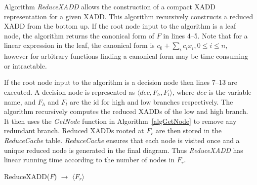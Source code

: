 \documentclass[twoside,11pt]{article}
\begin{document}
Algorithm \emph{ReduceXADD} allows the construction of a compact XADD representation for a given XADD. This algorithm recursively constructs a reduced XADD from the bottom up. 
If the root node input to the algorithm is a leaf node, the algorithm returns the canonical form of $F$ in lines 4--5. Note that for a linear expression in the leaf, the canonical form is $c_0+\sum_{i} c_i x_i , 0 \leq i \leq n$, however for arbitrary functions finding a canonical form may be time consuming or intractable. 

If the root node input to the algorithm is a decision node then lines 7--13 are executed. A decision node is represented as $\langle \mathit{dec}, F_h, F_l \rangle$, where $\mathit{dec}$ is the variable name, and $F_h$ and $F_l$ are the id for high and low branches respectively. The algorithm recursively computes the reduced XADDs of the low and high branch. It then uses the \emph{GetNode} function in Algorithm~\ref{algGetNode} to remove any redundant branch. 
Reduced XADDs rooted at $F_r$ are then stored in the \emph{ReduceCache} table. \emph{ReduceCache} ensures that each node is visited once and a unique reduced node is generated in the final diagram. Thus \emph{ReduceXADD} has linear running time according to the number of nodes in $F_r$.
\incmargin{.5em}
\linesnumbered
\begin{algorithm}[t!]
\dontprintsemicolon
{}
\caption{{\sc ReduceXADD}($F$) $\longrightarrow$ $\langle F_r \rangle$ \label{algReduceXADD}}
\end{algorithm}
\decmargin{.5em}
\end{document}
